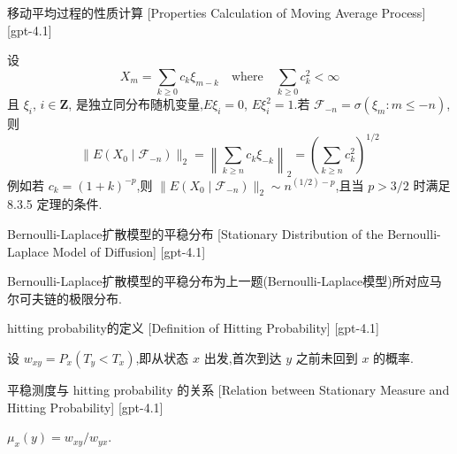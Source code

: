 \documentclass[UTF8]{ctexart}
\begin{document}
    
    
    \begin{xmp}
        {移动平均过程的性质计算}
        [Properties Calculation of Moving Average Process]
        [gpt-4.1]
        
设
\[
X_{m} = \sum_{k \geq 0} c_{k} \xi_{m - k} \quad \text{where} \quad \sum_{k \geq 0} c_{k}^{2} < \infty
\]
且 $\xi_{i}$, $i \in \mathbf{Z}$, 是独立同分布随机变量,$E\xi_{i} = 0$, $E\xi_{i}^{2} = 1$.若 $\mathcal{F}_{-n} = \sigma(\xi_{m}: m \le -n)$,则
\[
\|E(X_{0} \mid \mathcal{F}_{-n})\|_{2} = \left\| \sum_{k \geq n} c_{k} \xi_{-k} \right\|_{2} = \left( \sum_{k \geq n} c_{k}^{2} \right)^{1/2}
\]
例如若 $c_{k} = (1 + k)^{-p}$,则 $\|E(X_{0} \mid \mathcal{F}_{-n})\|_{2} \sim n^{(1/2) - p}$,且当 $p > 3/2$ 时满足 8.3.5 定理的条件.

    \end{xmp}
    
    
    
    \begin{thm}
        {Bernoulli-Laplace扩散模型的平稳分布}
        [Stationary Distribution of the Bernoulli-Laplace Model of Diffusion]
        [gpt-4.1]
        
Bernoulli-Laplace扩散模型的平稳分布为上一题(Bernoulli-Laplace模型)所对应马尔可夫链的极限分布.

    \end{thm}
    
    
    
    \begin{dfn}
        {hitting probability的定义}
        [Definition of Hitting Probability]
        [gpt-4.1]
        
设 $w _ { x y } = P _ { x } ( T _ { y } < T _ { x } )$,即从状态 $x$ 出发,首次到达 $y$ 之前未回到 $x$ 的概率.

    \end{dfn}
    
    
    
    \begin{thm}
        {平稳测度与 hitting probability 的关系}
        [Relation between Stationary Measure and Hitting Probability]
        [gpt-4.1]
        
$\mu _ { x } ( y ) = w _ { x y } / w _ { y x }$.

    \end{thm}
    
\end{document}
